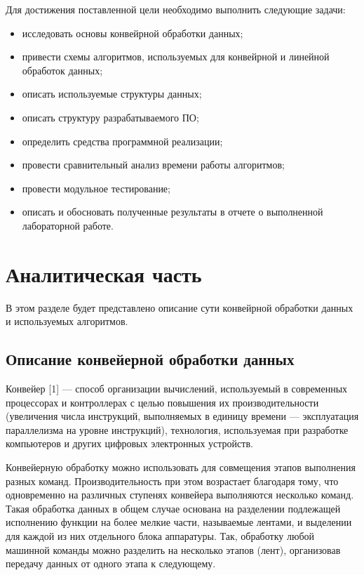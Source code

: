 \documentclass[a4paper,14pt, unknownkeysallowed]{extreport}
\begin{document}
Для достижения поставленной цели необходимо выполнить следующие задачи:

\begin{itemize}
	\item исследовать основы конвейрной обработки данных;
	\item привести схемы алгоритмов, используемых для конвейрной и линейной обработок данных;
	\item описать используемые структуры данных;
	\item описать структуру разрабатываемого ПО;
	\item определить средства программной реализации;
	\item провести сравнительный анализ времени работы алгоритмов;
	\item провести модульное тестирование;
	\item описать и обосновать полученные результаты в отчете о выполненной лабораторной работе.
\end{itemize}





\chapter{Аналитическая часть}
В этом разделе будет представлено описание сути конвейрной обработки данных и используемых алгоритмов.

\section{Описание конвейерной обработки данных}

Конвейер [1] — способ организации вычислений, используемый в современных процессорах и контроллерах с целью повышения их производительности (увеличения числа инструкций, выполняемых в единицу времени — эксплуатация параллелизма на уровне инструкций), технология, используемая при разработке компьютеров и других цифровых электронных устройств.

Конвейерную обработку можно использовать для совмещения этапов выполнения разных команд. Производительность при этом возрастает благодаря тому, что одновременно на различных ступенях конвейера выполняются несколько команд. Такая обработка данных в общем случае основана на разделении подлежащей исполнению функции на более мелкие части, называемые лентами, и выделении для каждой из них отдельного блока аппаратуры. Так, обработку любой машинной команды можно разделить на несколько этапов (лент), организовав передачу данных от одного этапа к следующему.
\end{document}
